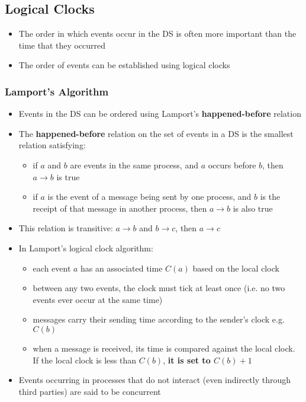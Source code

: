 \subsection{Logical Clocks}
\begin{itemize}
	\item The order in which events occur in the DS is often more important than the time that they occurred
	\item The order of events can be established using logical clocks	
\end{itemize}

\subsubsection{Lamport's Algorithm}
\begin{itemize}
	\item Events in the DS can be ordered using Lamport's \textbf{happened-before} relation
	\item The \textbf{happened-before} relation on the set of events in a DS is the smallest relation satisfying:
	\begin{itemize}
		\item if $a$ and $b$ are events in the same process, and $a$ occurs before $b$, then $a\rightarrow b$ is true
		\item if $a$ is the event of a message being sent by one process, and $b$ is the receipt of that message in another process, then $a \rightarrow b$ is also true
	\end{itemize}
	\item This relation is transitive:	
	\subitem $a\rightarrow b$ and $b\rightarrow c$, then $a\rightarrow c$
	\item In Lamport's logical clock algorithm:
	\begin{itemize}
		\item each event $a$ has an associated time $C(a)$ based on the local clock
		\item between any two events, the clock must tick at least once (i.e. no two events ever occur at the same time)
		\item messages carry their sending time according to the sender's clock e.g. $C(b)$
		\item when a message is received, its time is compared against the local clock. If the local clock is less than $C(b)$, \textbf{it is set to $C(b)+1$}
	\end{itemize}
	\item Events occurring in processes that do not interact (even indirectly through third parties) are said to be concurrent

\end{itemize}
